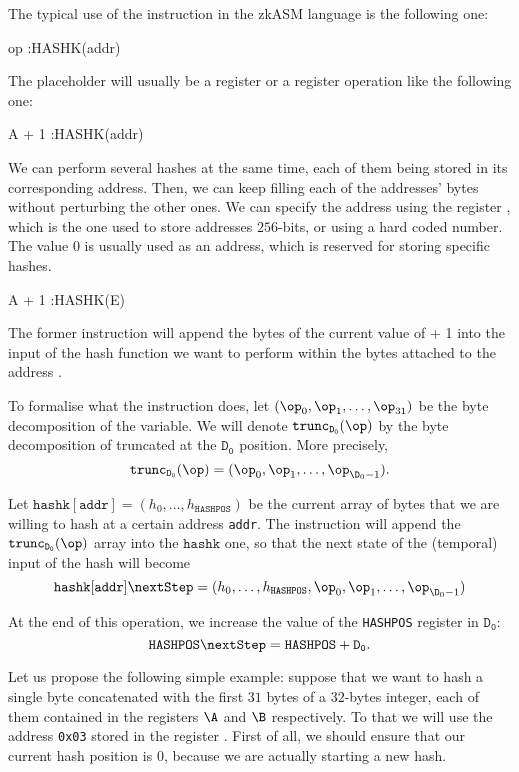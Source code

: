 The typical use of the \HASHK instruction in the zkASM language is the following one:

\begin{zkasm}
    op	:HASHK(addr)
\end{zkasm}

The \op placeholder will usually be a register or a register operation like the following one: 

\begin{zkasm}
    A + 1	:HASHK(addr)
\end{zkasm}

We can perform several hashes at the same time, each of them being stored in its corresponding address. Then, we can keep filling each of the addresses' bytes without perturbing the other ones. We can specify the address using the register \E, which is the one used to store addresses $256$-bits, or using a hard coded number. The value $0$ is usually used as an address, which is reserved for storing specific hashes. %

\begin{zkasm}
    A + 1	:HASHK(E)
\end{zkasm}

The former instruction will append the bytes of the current value of \A + 1 into the input of the hash function we want to perform within the bytes attached to the address \E. 

To formalise what the \HASHK instruction does, let $(\op_0, \op_1, \dots, \op_{31})$ be the byte decomposition of the \op variable. We will denote $\mathtt{trunc_{D_0}}(\op)$ by the byte decomposition of \op truncated at the $\mathtt{D_0}$ position. More precisely, 
\[
\mathtt{trunc_{D_0}(\op)} = (\op_0, \op_1, \dots, \op_{\D_0-1}).
\]

Let $\mathtt{hashk}[\texttt{addr}] = (h_0, \dots, h_{\texttt{HASHPOS}})$ be the current array of bytes that we are willing to hash at a certain address \texttt{addr}. The \HASHK instruction will append the $\mathtt{trunc_{D_0}}(\op)$ array into the $\mathtt{hashk}$ one, so that the next state of the (temporal) input of the hash will become 
\[
\mathtt{hashk}[\texttt{addr}] \nextStep = (h_0, \dots, h_{\texttt{HASHPOS}}, \op_0, \op_1, \dots, \op_{\D_0-1})
\]

At the end of this operation, we increase the value of the \texttt{HASHPOS} register in $\mathtt{D_0}$:
\[
\mathtt{HASHPOS} \nextStep = \mathtt{HASHPOS} + \mathtt{D_0}.
\]

Let us propose the following simple example: suppose that we want to hash a single byte concatenated with the first $31$ bytes of a $32$-bytes integer, each of them contained in the registers $\A$ and $\B$ respectively. To that we will use the address \texttt{0x03} stored in the register \E. First of all, we should ensure that our current hash position is $0$, because we are actually starting a new hash.

